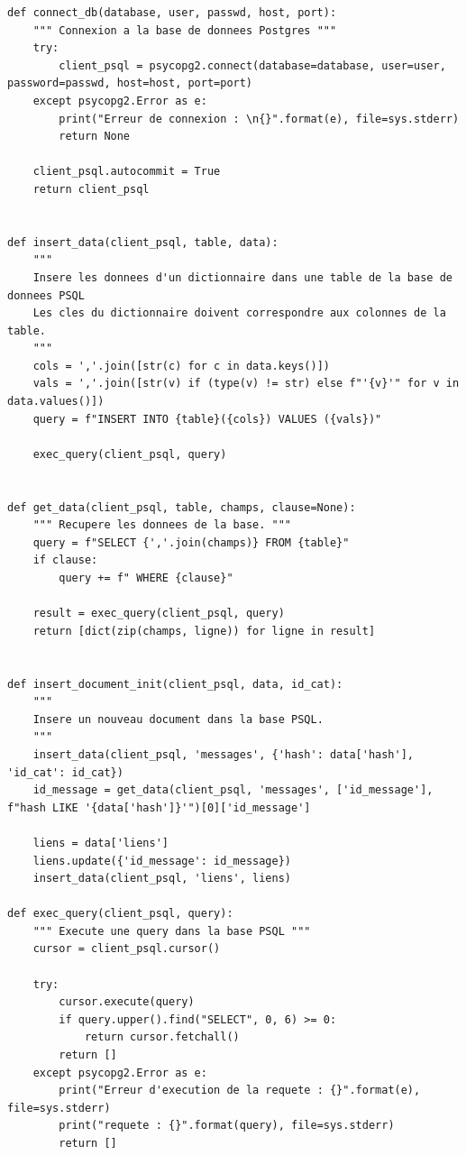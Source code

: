 \documentclass[a4paper,12pt]{article}
\begin{document}
				\begin{lstlisting}[title=Fonctions basiques pour la liaison PostgreSQL]
def connect_db(database, user, passwd, host, port):
    """ Connexion a la base de donnees Postgres """
    try:
        client_psql = psycopg2.connect(database=database, user=user, password=passwd, host=host, port=port)
    except psycopg2.Error as e:
        print("Erreur de connexion : \n{}".format(e), file=sys.stderr)
        return None

    client_psql.autocommit = True
    return client_psql
    
    
def insert_data(client_psql, table, data):
    """
    Insere les donnees d'un dictionnaire dans une table de la base de donnees PSQL
    Les cles du dictionnaire doivent correspondre aux colonnes de la table.
    """
    cols = ','.join([str(c) for c in data.keys()])
    vals = ','.join([str(v) if (type(v) != str) else f"'{v}'" for v in data.values()])
    query = f"INSERT INTO {table}({cols}) VALUES ({vals})"

    exec_query(client_psql, query)


def get_data(client_psql, table, champs, clause=None):
    """ Recupere les donnees de la base. """
    query = f"SELECT {','.join(champs)} FROM {table}"
    if clause:
        query += f" WHERE {clause}"

    result = exec_query(client_psql, query)
    return [dict(zip(champs, ligne)) for ligne in result]
    
    
def insert_document_init(client_psql, data, id_cat):
    """
    Insere un nouveau document dans la base PSQL.
    """
    insert_data(client_psql, 'messages', {'hash': data['hash'], 'id_cat': id_cat})
    id_message = get_data(client_psql, 'messages', ['id_message'], f"hash LIKE '{data['hash']}'")[0]['id_message']

    liens = data['liens']
    liens.update({'id_message': id_message})
    insert_data(client_psql, 'liens', liens)   
    
def exec_query(client_psql, query):
    """ Execute une query dans la base PSQL """
    cursor = client_psql.cursor()

    try:
        cursor.execute(query)
        if query.upper().find("SELECT", 0, 6) >= 0:
            return cursor.fetchall()
        return []
    except psycopg2.Error as e:
        print("Erreur d'execution de la requete : {}".format(e), file=sys.stderr)
        print("requete : {}".format(query), file=sys.stderr)
        return []
				\end{lstlisting}
				
\end{document}

